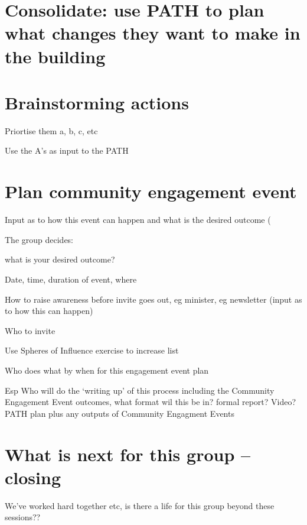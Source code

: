 \documentclass[letterpaper,10pt,english]{jupyterBook}
\begin{document}
\section{Consolidate:  use PATH to plan what changes they want to make in the building}
\label{\detokenize{session4/session4:consolidate-use-path-to-plan-what-changes-they-want-to-make-in-the-building}}

\section{Brainstorming actions}
\label{\detokenize{session4/session4:brainstorming-actions}}
\sphinxAtStartPar
Priortise them a, b, c, etc

\sphinxAtStartPar
Use the A’s as input to the PATH


\section{Plan community engagement event}
\label{\detokenize{session4/session4:plan-community-engagement-event}}
\sphinxAtStartPar
Input as to how this event can happen and what is the desired outcome (

\sphinxAtStartPar
The group decides:

\sphinxAtStartPar
what is your desired outcome?

\sphinxAtStartPar
Date, time, duration of event, where

\sphinxAtStartPar
How to raise awareness before invite goes out, eg minister, eg newsletter (input as to how this can happen)

\sphinxAtStartPar
Who to invite

\sphinxAtStartPar
Use Spheres of Influence exercise to increase list

\sphinxAtStartPar
Who does what by when for this engagement event plan

\sphinxAtStartPar
Esp Who will do the ‘writing up’ of this process including the Community Engagement Event outcomes, what format wil this be in?  formal report?  Video? PATH plan plus any outputs of Community Engagment Events


\section{What is next for this group – closing}
\label{\detokenize{session4/session4:what-is-next-for-this-group-closing}}
\sphinxAtStartPar
We’ve worked hard together etc, is there a life for this group beyond these sessions??
\end{document}
